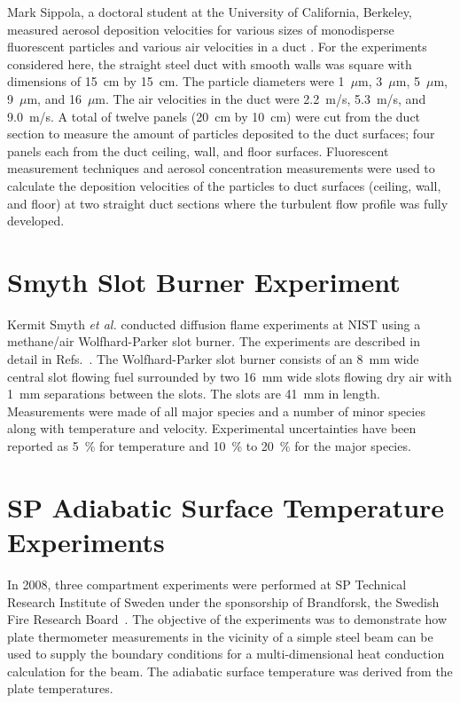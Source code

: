 Mark Sippola, a doctoral student at the University of California, Berkeley, measured aerosol
deposition velocities for various sizes of monodisperse fluorescent particles and various air
velocities in a duct \cite{Sippola:2002,Sippola:2010}. For the experiments considered here,
the straight steel duct with smooth walls was square with dimensions of 15~cm by 15~cm. The
particle diameters were 1~$\mu$m, 3~$\mu$m, 5~$\mu$m, 9~$\mu$m, and 16~$\mu$m. The air velocities
in the duct were 2.2~m/s, 5.3~m/s, and 9.0~m/s. A total of twelve panels (20~cm by 10~cm) were cut
from the duct section to measure the amount of particles deposited to the duct surfaces; four
panels each from the duct ceiling, wall, and floor surfaces. Fluorescent measurement techniques
and aerosol concentration measurements were used to calculate the deposition velocities of the
particles to duct surfaces (ceiling, wall, and floor) at two straight duct sections where the
turbulent flow profile was fully developed.

\section{Smyth Slot Burner Experiment}

Kermit Smyth {\em et al.} conducted diffusion flame experiments at NIST using a methane/air Wolfhard-Parker slot burner.  The experiments are described in
detail in Refs.~\cite{Norton:1,Smyth:1}.  The Wolfhard-Parker slot burner consists of an 8~mm wide
central slot flowing fuel surrounded by two 16~mm wide slots flowing dry air with 1~mm separations between the slots.
The slots are 41~mm in length.  Measurements were made of all major species and a number of minor species along with temperature
and velocity.  Experimental uncertainties have been reported as 5~\% for temperature  and 10~\% to 20~\%
for the major species.

\section{SP Adiabatic Surface Temperature Experiments}

In 2008, three compartment experiments were performed at SP Technical Research Institute of Sweden under the sponsorship of Brandforsk, the Swedish Fire Research Board~\cite{Wickstrom_AST}. The objective of the experiments was to demonstrate how plate thermometer measurements in the vicinity of a simple steel beam can be used to supply the boundary conditions for a multi-dimensional heat conduction calculation for the beam. The adiabatic surface temperature was derived from the plate temperatures.

